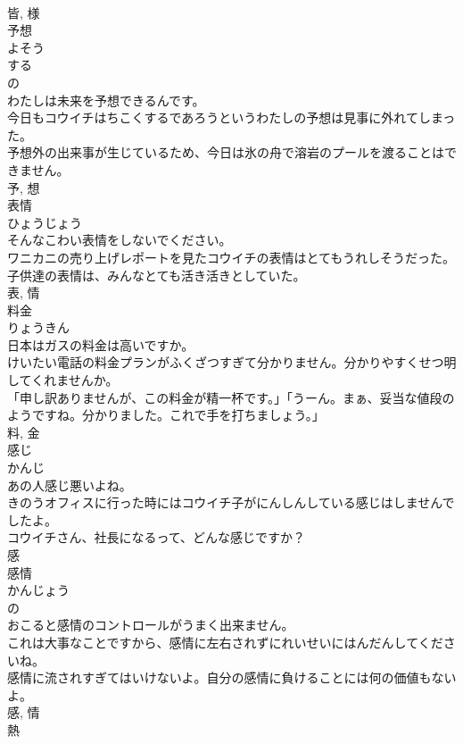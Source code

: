\documentclass[8pt]{extreport}
\begin{document}
\begin{CJK}{UTF8}{min}
\\	皆, 様	
\\	予想	
\\	よそう	
\\	する 
\\	の 
\\	わたしは未来を予想できるんです。	
\\	今日もコウイチはちこくするであろうというわたしの予想は見事に外れてしまった。	
\\	予想外の出来事が生じているため、今日は氷の舟で溶岩のプールを渡ることはできません。	
\\	予, 想	
\\	表情	
\\	ひょうじょう	
\\	そんなこわい表情をしないでください。	
\\	ワニカニの売り上げレポートを見たコウイチの表情はとてもうれしそうだった。	
\\	子供達の表情は、みんなとても活き活きとしていた。	
\\	表, 情	
\\	料金	
\\	りょうきん	
\\	日本はガスの料金は高いですか。	
\\	けいたい電話の料金プランがふくざつすぎて分かりません。分かりやすくせつ明してくれませんか。	
\\	「申し訳ありませんが、この料金が精一杯です。」「うーん。まぁ、妥当な値段のようですね。分かりました。これで手を打ちましょう。」	
\\	料, 金	
\\	感じ	
\\	かんじ	
\\	あの人感じ悪いよね。	
\\	きのうオフィスに行った時にはコウイチ子がにんしんしている感じはしませんでしたよ。	
\\	コウイチさん、社長になるって、どんな感じですか？	
\\	感	
\\	感情	
\\	かんじょう	
\\	の 
\\	おこると感情のコントロールがうまく出来ません。	
\\	これは大事なことですから、感情に左右されずにれいせいにはんだんしてくださいね。	
\\	感情に流されすぎてはいけないよ。自分の感情に負けることには何の価値もないよ。	
\\	感, 情	
\\	熱	

\end{CJK}
\end{document}
